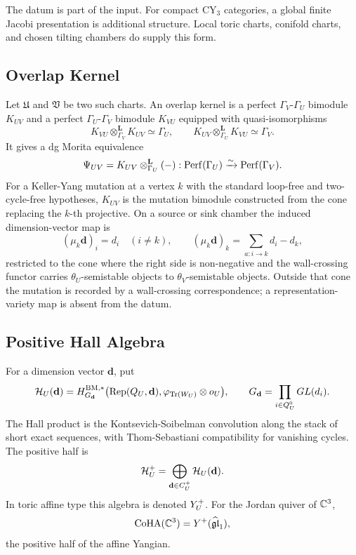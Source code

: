 The datum is part of the input. For compact CY$_3$ categories, a global
finite Jacobi presentation is additional structure. Local toric charts,
conifold charts, and chosen tilting chambers do supply this form.

\subsection*{Overlap Kernel}

Let \(\mathfrak U\) and \(\mathfrak V\) be two such charts. An overlap
kernel is a perfect \(\Gamma_V\)-\(\Gamma_U\) bimodule \(K_{UV}\) and a
perfect \(\Gamma_U\)-\(\Gamma_V\) bimodule \(K_{VU}\) equipped with
quasi-isomorphisms
\[
  K_{VU}\otimes^{\mathbf L}_{\Gamma_V}K_{UV}\simeq \Gamma_U,\qquad
  K_{UV}\otimes^{\mathbf L}_{\Gamma_U}K_{VU}\simeq \Gamma_V .
\]
It gives a dg Morita equivalence
\[
  \Psi_{UV}=
  K_{UV}\otimes^{\mathbf L}_{\Gamma_U}(-):
  \mathrm{Perf}(\Gamma_U)\xrightarrow{\sim}\mathrm{Perf}(\Gamma_V).
\]
For a Keller-Yang mutation at a vertex \(k\) with the standard
loop-free and two-cycle-free hypotheses, \(K_{UV}\) is the mutation bimodule
constructed from the cone replacing the \(k\)-th projective. On a
source or sink chamber the induced dimension-vector map is
\[
  (\mu_k\mathbf d)_i=d_i \quad (i\ne k),\qquad
  (\mu_k\mathbf d)_k=\sum_{a:i\to k}d_i-d_k ,
\]
restricted to the cone where the right side is non-negative and the
wall-crossing functor carries \(\theta_U\)-semistable objects to
\(\theta_V\)-semistable objects. Outside that cone the mutation is
recorded by a wall-crossing correspondence; a representation-variety
map is absent from the datum.

\subsection*{Positive Hall Algebra}

For a dimension vector \(\mathbf d\), put
\[
  \mathcal H_U(\mathbf d)
  =
  H^{\mathrm{BM},*}_{G_{\mathbf d}}
  \bigl(\mathrm{Rep}(Q_U,\mathbf d),
  \varphi_{\mathrm{Tr}(W_U)}\otimes o_U\bigr),
  \qquad
  G_{\mathbf d}=\prod_{i\in Q_U^0}GL(d_i).
\]
The Hall product is the Kontsevich-Soibelman convolution along the
stack of short exact sequences, with Thom-Sebastiani compatibility for
vanishing cycles. The positive half is
\[
  \mathcal H_U^+
  =
  \bigoplus_{\mathbf d\in C_U^+}\mathcal H_U(\mathbf d).
\]
In toric affine type this algebra is denoted \(Y^{+}_U\). For the
Jordan quiver of \(\mathbb C^3\),
\[
  \mathrm{CoHA}(\mathbb C^3)
  =
  Y^{+}(\widehat{\mathfrak{gl}}_1),
\]
the positive half of the affine Yangian.

